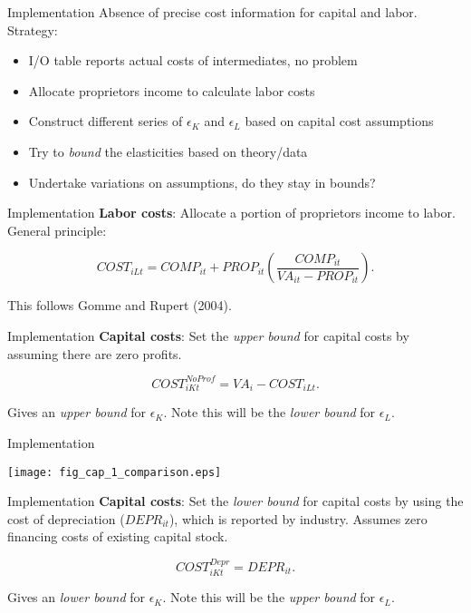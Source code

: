 \documentclass[10pt, xcolor=dvipsnames]{beamer}
\begin{document}
\begin{frame}{Implementation}
Absence of precise cost information for capital and labor. Strategy:

\begin{itemize}
  \item I/O table reports actual costs of intermediates, no problem
  \item Allocate proprietors income to calculate labor costs
  \item Construct different series of $\epsilon_K$ and $\epsilon_L$ based on capital cost assumptions
  \item Try to \textit{bound} the elasticities based on theory/data
  \item Undertake variations on assumptions, do they stay in bounds?
\end{itemize}

\end{frame}

\begin{frame}{Implementation}
\textbf{Labor costs}: Allocate a portion of proprietors income to labor. General principle:

\begin{equation}
  COST_{iLt} = COMP_{it} + PROP_{it}\left(\frac{COMP_{it}}{VA_{it}-PROP_{it}}\right).
\end{equation}

This follows Gomme and Rupert (2004).

\end{frame}

\begin{frame}{Implementation}
\textbf{Capital costs}: Set the \textit{upper bound} for capital costs by assuming there are zero profits.

\begin{equation}
  COST_{iKt}^{NoProf} = VA_i - COST_{iLt}.
\end{equation}

Gives an \textit{upper bound} for $\epsilon_K$. Note this will be the \textit{lower bound} for $\epsilon_L$.

\end{frame}

\begin{frame}{Implementation}
\begin{center}
\texttt{[image: fig\_cap\_1\_comparison.eps]}
\end{center}
\end{frame}

\begin{frame}{Implementation}
\textbf{Capital costs}: Set the \textit{lower bound} for capital costs by using the cost of depreciation ($DEPR_{it}$), which is reported by industry. Assumes zero financing costs of existing capital stock.

\begin{equation}
  COST_{iKt}^{Depr} = DEPR_{it}.
\end{equation}

Gives an \textit{lower bound} for $\epsilon_K$. Note this will be the \textit{upper bound} for $\epsilon_L$.

\end{frame}
\end{document}

